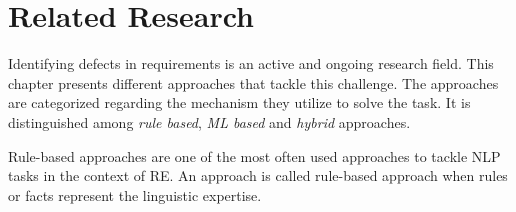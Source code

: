 \chapter{Related Research}
\label{chp:related_research}
Identifying defects in requirements is an active and ongoing research field.
This chapter presents different approaches that tackle this challenge.
The approaches are categorized regarding the mechanism they utilize to solve the task.
It is distinguished among \textit{rule based}, \textit{\ac{ML} based} and \textit{hybrid} approaches. %

Rule-based approaches are one of the most often used approaches to tackle \ac{NLP} tasks in the context of \ac{RE}.
An approach is called rule-based approach when rules or facts represent the linguistic expertise. \parencite{Zhao:2020}

% 
